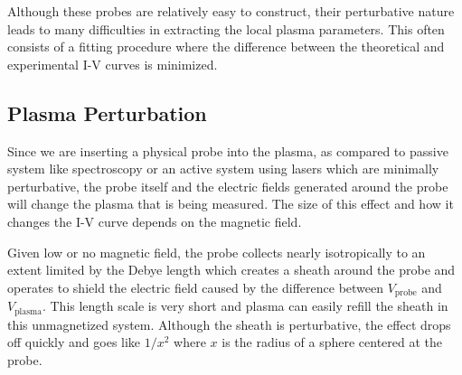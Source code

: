 

Although these probes are relatively easy to construct, their perturbative nature leads to many difficulties in extracting the local plasma parameters. This often consists of a fitting procedure where the difference between the theoretical and experimental I-V curves is minimized.


\subsection{Plasma Perturbation}

Since we are inserting a physical probe into the plasma, as compared to passive system like spectroscopy or an active system using lasers which are minimally perturbative, the probe itself and the electric fields generated around the probe will change the plasma that is being measured. The size of this effect and how it changes the I-V curve depends on the magnetic field.


Given low or no magnetic field, the probe collects nearly isotropically to an extent limited by the Debye length which creates a sheath around the probe and operates to shield the electric field caused by the difference between $V_\text{probe}$ and $V_\text{plasma}$. This length scale is very short and plasma can easily refill the sheath in this unmagnetized system. Although the sheath is perturbative, the effect drops off quickly and goes like $1 / x^2$ where $x$ is the radius of a sphere centered at the probe.

